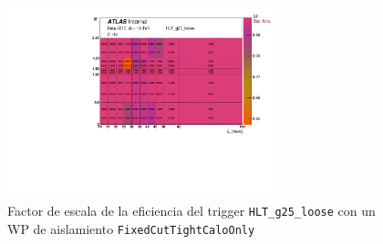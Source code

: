\begin{figure}

	\centering


  \includegraphics[width=0.7\textwidth]{images/2017_h_sf_et_eta_tr_HLT_g25_loose_FixedCutTightCaloOnly.pdf}
  \caption{Factor de escala de la eficiencia del trigger \texttt{HLT\_g25\_loose} con un WP de aislamiento \texttt{FixedCutTightCaloOnly} 
}

  \label{SFfig}
\end{figure}


